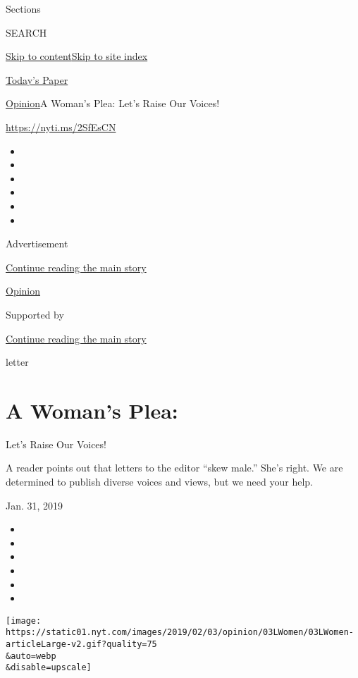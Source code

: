 Sections

SEARCH

\protect\hyperlink{site-content}{Skip to
content}\protect\hyperlink{site-index}{Skip to site index}

\href{https://myaccount.nytimes.com/auth/login?response_type=cookie\&client_id=vi}{}

\href{https://www.nytimes.com/section/todayspaper}{Today's Paper}

\href{/section/opinion}{Opinion}\textbar{}A Woman's Plea: Let's Raise
Our Voices!

\url{https://nyti.ms/2SfEsCN}

\begin{itemize}
\item
\item
\item
\item
\item
\item
\end{itemize}

Advertisement

\protect\hyperlink{after-top}{Continue reading the main story}

\href{/section/opinion}{Opinion}

Supported by

\protect\hyperlink{after-sponsor}{Continue reading the main story}

letter

\hypertarget{a-womans-plea}{%
\section{A Woman's Plea:}\label{a-womans-plea}}

Let's Raise Our Voices!

A reader points out that letters to the editor ``skew male.'' She's
right. We are determined to publish diverse voices and views, but we
need your help.

Jan. 31, 2019

\begin{itemize}
\item
\item
\item
\item
\item
\item
\end{itemize}

\texttt{[image: https://static01.nyt.com/images/2019/02/03/opinion/03LWomen/03LWomen-articleLarge-v2.gif?quality=75\\\&auto=webp\\\&disable=upscale]}


